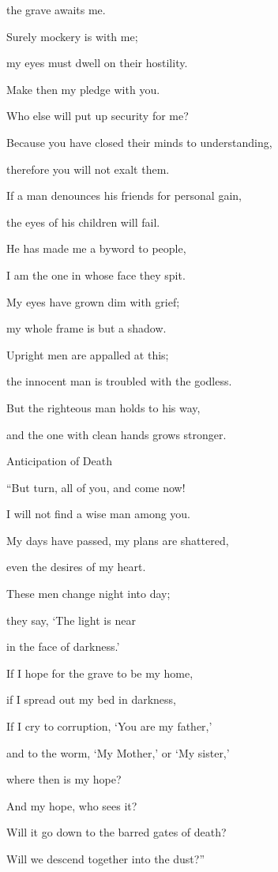 {\par }{\Q the grave
awaits me.
\par }{\Q {}Surely
mockery
is with me;
\par }{\Q my eyes must dwell on their hostility.
\par }{\Q {}Make
then my pledge
with
you.
\par }{\Q Who
else
will put up security for me?
\par }{\Q {}Because
you have closed
their minds
to understanding,
\par }{\Q therefore
you will not
exalt them.
\par }{\Q {}If
a man
denounces
his friends
for personal gain,
\par }{\Q the eyes
of his children
will fail.
\par }{\Q {}He has made me a byword
to people,
\par }{\Q I am the one in whose face
they spit.
\par }{\Q {}My eyes
have grown dim
with grief;
\par }{\Q my whole
frame
is but a shadow.
\par }{\Q {}Upright
men are appalled
at this;
\par }{\Q the innocent
man is troubled
with the godless.
\par }{\Q {}But the righteous
man holds
to his way,
\par }{\Q and the one with clean
hands
grows
stronger.
\par }{\SH Anticipation of Death
\par }{\Q {}“But
turn,
all
of you, and come
now!

\par }{\Q I will not
find
a wise man among you.
\par }{\Q {}My days
have passed,
my plans are shattered,
\par }{\Q even the desires
of my heart.
\par }{\Q {}These men change night
into day;
\par }{\Q they say, ‘The light
is near
\par }{\Q in the face
of darkness.’
\par }{\Q {}If
I hope
for the grave
to be my home,
\par }{\Q if I spread
out my bed
in darkness,
\par }{\Q {}If I cry
to corruption, ‘You
are my father,’
\par }{\Q and to the worm,
‘My Mother,’
or ‘My sister,’
\par }{\Q {}where
then
is my hope?
\par }{\Q And my hope,
who
sees it?
\par }{\Q {}Will it go down
to the barred gates of death?
\par }{\Q Will we descend
together
into the dust?”

}
